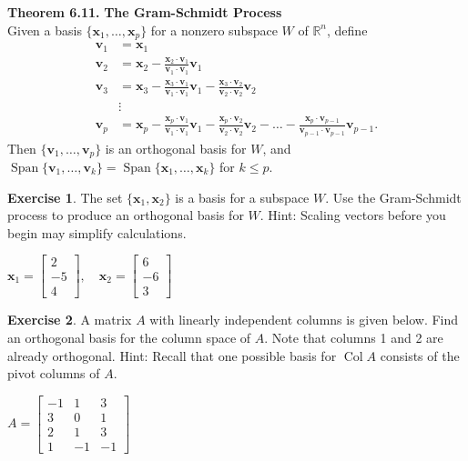 \documentclass[10pt]{book}
\newcommand{\boxcolor}{gray!30}
\newenvironment{boxthm}{\begin{mdframed}[backgroundcolor=\boxcolor,nobreak=true]}{\end{mdframed}}
\theoremstyle{definition}
\newtheorem{exercise}{Exercise}[section]
\newcommand{\R}{\mathbb{R}}
\newcommand{\vect}[1]{\ensuremath{\boldsymbol{\mathbf{#1}}}}
\DeclareMathOperator{\Span}{Span}
\DeclareMathOperator{\Col}{Col}
\newcommand{\vectset}[3][v]{\{\vect{#1}_{#2},\ldots,\vect{#1}_{#3}\}}
\newcommand{\vectsetvp}{\{\vect{v}_1,\ldots,\vect{v}_p\}}
\begin{document}
\begin{boxthm}
	\textbf{Theorem 6.11.}
	\textbf{The Gram-Schmidt Process} \\
	Given a basis $\vectset[x]{1}{p}$ for a nonzero subspace $W$ of $\R^n$, define
	\vspace{-1ex}
	\begin{align*}
	\vect{v}_1 &= \vect{x}_1 \\
	\vect{v}_2 &= \vect{x}_2 - \frac{\vect{x}_2\cdot\vect{v}_1}{\vect{v}_1\cdot\vect{v}_1}\vect{v}_1 \\
	\vect{v}_3 &= \vect{x}_3 - \frac{\vect{x}_3\cdot\vect{v}_1}{\vect{v}_1\cdot\vect{v}_1}\vect{v}_1 - \frac{\vect{x}_3\cdot\vect{v}_2}{\vect{v}_2\cdot\vect{v}_2}\vect{v}_2 \\
	&\vdots \\
	\vect{v}_p &= \vect{x}_p - \frac{\vect{x}_p\cdot\vect{v}_1}{\vect{v}_1\cdot\vect{v}_1}\vect{v}_1 - \frac{\vect{x}_p\cdot\vect{v}_2}{\vect{v}_2\cdot\vect{v}_2}\vect{v}_2 - \ldots -  \frac{\vect{x}_p\cdot\vect{v}_{p-1}}{\vect{v}_{p-1}\cdot\vect{v}_{p-1}}\vect{v}_{p-1}.
	\end{align*}
	Then $\vectsetvp$ is an orthogonal basis for $W$, and $\Span\vectset{1}{k} = \Span\vectset[x]{1}{k}$ for $k\leq p$.
\end{boxthm}


\begin{exercise} %
	The set $\{\vect{x}_1,\vect{x}_2\}$ is a basis for a subspace $W$. Use the Gram-Schmidt process to produce an orthogonal basis for $W$. Hint: Scaling vectors before you begin may simplify calculations.
	
	\vspace{1em}
	$ \vect{x}_1 = \begin{bmatrix}2\\-5\\4\end{bmatrix}, \quad
	\vect{x}_2 = \begin{bmatrix}6\\-6\\3\end{bmatrix} $
\end{exercise}
\vfill


\begin{exercise} %
	A matrix $A$ with linearly independent columns is given below. Find an orthogonal basis for the column space of $A$. Note that columns 1 and 2 are already orthogonal. Hint: Recall that one possible basis for $\Col A$ consists of the pivot columns of $A$.
	
	\vspace{1em}
	$ A = \begin{bmatrix}-1&1&3\\3&0&1\\2&1&3\\1&-1&-1\end{bmatrix} $
\end{exercise}
\vfill
\end{document}

